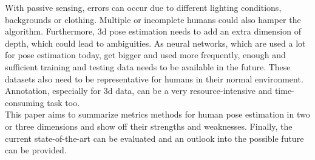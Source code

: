 With passive sensing, errors can occur due to different lighting conditions, backgrounds or clothing. Multiple or incomplete humans could also hamper the algorithm. Furthermore, 3d pose estimation needs to add an extra dimension of depth, which could lead to ambiguities. As neural networks, which are used a lot for pose estimation today, get bigger and used more frequently, enough and sufficient training and testing data needs to be available in the future. These datasets also need to be representative for humans in their normal environment. Annotation, especially for 3d data, can be a very resource-intensive and time-consuming task too.
\\
This paper aims to summarize metrics methods for human pose estimation in two or three dimensions and show off their strengths and weaknesses. Finally, the current state-of-the-art can be evaluated and an outlook into the possible future can be provided.